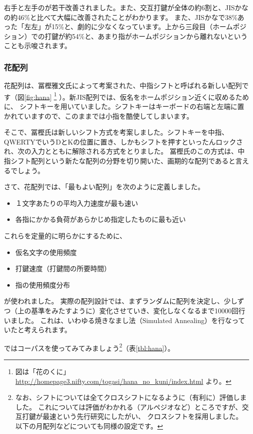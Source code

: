右手と左手のが若干改善されました。また、交互打鍵が全体の約6割と、JISかなの約46\%と比べて大幅に改善されたことがわかります。
また、JISかなで38\%あった「左左」が15\%と、劇的に少なくなっています。上から三段目（ホームポジション）での打鍵が約54\%と、あまり指がホームポジションから離れないということも示唆されます。

\subsubsection*{花配列}

花配列は、冨樫雅文氏によって考案された、中指シフトと呼ばれる新しい配列です（図\ref{fig:hana}%
\footnote{図は「花のくに」\url{http://homepage3.nifty.com/togasi/hana_no_kuni/index.html} より。}%
）。新JIS配列では、仮名をホームポジション近くに収めるために、
シフトキーを用いていました。シフトキーはキーボードの右端と左端に置かれていますので、このままでは小指を酷使してしまいます。

そこで、冨樫氏は新しいシフト方式を考案しました。シフトキーを中指、QWERTYでいうDとKの位置に置き、しかもシフトを押すといったんロックされ、次の入力とともに解除される方式をとりました。
冨樫氏のこの方式は、中指シフト配列という新たな配列の分野を切り開いた、画期的な配列であると言えるでしょう。

さて、花配列では、「最もよい配列」を次のように定義しました。

\begin{itemize}
\item １文字あたりの平均入力速度が最も速い
\item 各指にかかる負荷があらかじめ指定したものに最も近い
\end{itemize}

これらを定量的に明らかにするために、
\begin{itemize}
\item 仮名文字の使用頻度
\item 打鍵速度（打鍵間の所要時間）
\item 指の使用頻度分布
\end{itemize}
が使われました。
実際の配列設計では、まずランダムに配列を決定し、少しずつ（上の基準をみたすように）変化させていき、変化しなくなるまで10000回行いました。
これは、いわゆる焼きなまし法（Simulated Annealing）を行なっていたと考えられます。

ではコーパスを使ってみてみましょう\footnote{%
なお、シフトについては全てクロスシフトになるように（有利に）評価しました。
これについては評価がわかれる（アルペジオなど）ところですが、交互打鍵が最速という先行研究にしたがい、
クロスシフトを採用しました。以下の月配列などについても同様の設定です。}（表\ref{tbl:hana}）。

